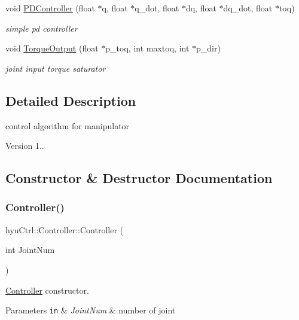 \begin{DoxyCompactItemize}
void \hyperlink{classhyu_ctrl_1_1_controller_a2c25a1138590d2530ad0af1bb6bcaba6}{P\+D\+Controller} (float $\ast$q, float $\ast$q\+\_\+dot, float $\ast$dq, float $\ast$dq\+\_\+dot, float $\ast$toq)
\begin{DoxyCompactList}\small\item\em simple pd controller \end{DoxyCompactList}\item 
void \hyperlink{classhyu_ctrl_1_1_controller_afc428ab49a86e7c159cadb4d0496d97b}{Torque\+Output} (float $\ast$p\+\_\+toq, int maxtoq, int $\ast$p\+\_\+dir)
\begin{DoxyCompactList}\small\item\em joint input torque saturator \end{DoxyCompactList}\end{DoxyCompactItemize}


\subsection{Detailed Description}
control algorithm for manipulator 

\begin{DoxyVersion}{Version}
1.. 
\end{DoxyVersion}


\subsection{Constructor \& Destructor Documentation}
\mbox{\label{classhyu_ctrl_1_1_controller_aa3ac4e6fe270eadd7892f2c6da4f57dc}} 
\subsubsection{\texorpdfstring{Controller()}{Controller()}}
{\footnotesize\ttfamily hyu\+Ctrl\+::\+Controller\+::\+Controller (\begin{DoxyParamCaption}\item[{int}]{Joint\+Num }\end{DoxyParamCaption})}



\hyperlink{classhyu_ctrl_1_1_controller}{Controller} constructor. 


\begin{DoxyParams}[1]{Parameters}
\mbox{\tt in}  & {\em Joint\+Num} & number of joint \\
\hline
\end{DoxyParams}


